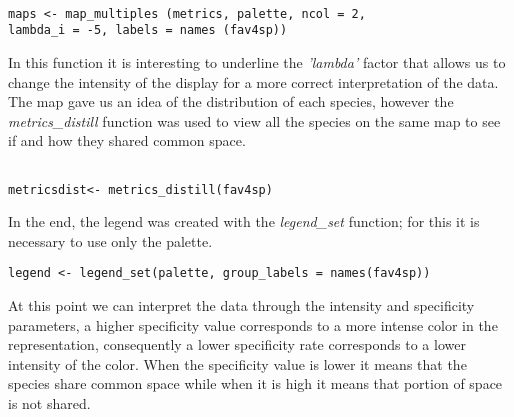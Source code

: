 \documentclass[12pt,a4paper]{article}
\begin{document}
\begin{lstlisting}

maps <- map_multiples (metrics, palette, ncol = 2,
lambda_i = -5, labels = names (fav4sp))

\end{lstlisting}
\bigskip
In this function it is interesting to underline the \textit{'lambda'} factor that allows us to change the intensity of the display for a more correct interpretation of the data.\\
The map gave us an idea of the distribution of each species, however the \textit{metrics\_distill} function was used to view all the species on the same map to see if and how they shared common space.
\begin{lstlisting}

metricsdist<- metrics_distill(fav4sp)

\end{lstlisting}
\bigskip
In the end, the legend was created with the \textit{legend\_set} function; for this it is necessary to use only the palette.
\\
\begin{lstlisting}
legend <- legend_set(palette, group_labels = names(fav4sp))

\end{lstlisting}
\bigskip
At this point we can interpret the data through the intensity and specificity parameters, a higher specificity value corresponds to a more intense color in the representation, consequently a lower specificity rate corresponds to a lower intensity of the color.
When the specificity value is lower it means that the species share common space while when it is high it means that portion of space is not shared.
\end{document}
